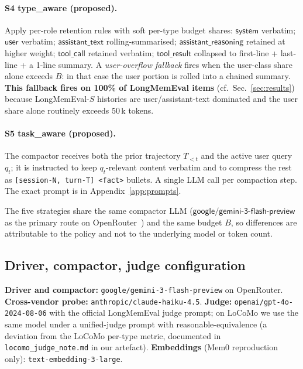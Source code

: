 \documentclass{article}
\begin{document}
\paragraph{S4 \textsf{type\_aware} (proposed).}
Apply per-role retention rules with soft per-type budget shares:
$\textsf{system}$ verbatim; $\textsf{user}$ verbatim; $\textsf{assistant\_text}$
rolling-summarised; $\textsf{assistant\_reasoning}$ retained at higher
weight; $\textsf{tool\_call}$ retained verbatim; $\textsf{tool\_result}$
collapsed to first-line + last-line + a 1-line summary. A
\emph{user-overflow fallback} fires when the user-class share alone
exceeds $B$: in that case the user portion is rolled into a chained
summary. \textbf{This fallback fires on 100\% of LongMemEval items} (cf.\
Sec.~\ref{sec:results}) because LongMemEval-$S$ histories are
user/assistant-text dominated and the user share alone routinely
exceeds 50\,k tokens.

\paragraph{S5 \textsf{task\_aware} (proposed).}
The compactor receives both the prior trajectory $T_{<t}$ and the active
user query $q_t$; it is instructed to keep $q_t$-relevant content
verbatim and to compress the rest as
\verb|[session-N, turn-T] <fact>| bullets. A single LLM call per
compaction step. The exact prompt is in
Appendix~\ref{app:prompts}.

The five strategies share the same compactor LLM
($\textsf{google/gemini-3-flash-preview}$ as the primary route on
OpenRouter~\citep{openrouter_2026}) and the same budget $B$, so
differences are attributable to the policy and not to the underlying
model or token count.

\subsection{Driver, compactor, judge configuration}

\textbf{Driver and compactor:} \texttt{google/gemini-3-flash-preview}
on OpenRouter. \textbf{Cross-vendor probe:}
\texttt{anthropic/claude-haiku-4.5}.
\textbf{Judge:} \texttt{openai/gpt-4o-2024-08-06} with the official
LongMemEval judge prompt; on LoCoMo we use the same model under a
unified-judge prompt with reasonable-equivalence (a deviation from the
LoCoMo per-type metric, documented in \texttt{locomo\_judge\_note.md}
in our artefact). \textbf{Embeddings} (Mem0
reproduction only): \texttt{text-embedding-3-large}.
\end{document}
